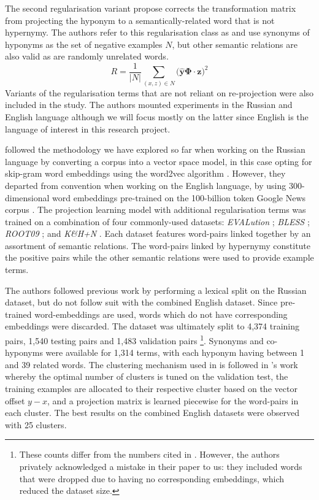 The second regularisation variant \citeauthor{ustalov2017negative} propose corrects the transformation matrix from projecting the hyponym to a semantically-related word that is not hypernymy.  The authors refer to this regularisation class as  and use synonyms of hyponyms as the set of negative examples $N$, but other semantic relations are also valid as are randomly unrelated words.
\[R = \frac{1}{\vert N \vert} \sum_{(x,z) \in N} \big( \hat{\bm{y}} \bm{\Phi} \cdot \bm{z} \big)^2\]
Variants of the regularisation terms that are not reliant on re-projection were also included in the study.  The authors mounted experiments in the Russian and English language although we will focus mostly on the latter since English is the language of interest in this research project.

\citeauthor{ustalov2017negative} followed the methodology we have explored so far when working on the Russian language by converting a corpus into a vector space model, in this case opting for skip-gram word embeddings using the word2vec algorithm \citep{mikolov2013efficient}.  However, they departed from convention when working on the English language, by using 300-dimensional word embeddings pre-trained on the 100-billion token Google News corpus \citep{mikolov2013efficient}.  The projection learning model with additional regularisation terms was trained on a combination of four commonly-used datasets: \textit{EVALution} \citep{santus2015evalution}; \textit{BLESS} \citep{Baroni2011}; \textit{ROOT09} \citep{santus2016nine}; and \textit{K\&H+N} \citep{necsulescu2015reading}.  Each dataset features word-pairs linked together by an assortment of semantic relations.  The word-pairs linked by hypernymy constitute the positive pairs while the other semantic relations were used to provide  example terms.  

The authors followed previous work \citep{levy2015supervised, shwartz2017siege, santus2016nine, roller2014inclusive} by performing a lexical split on the Russian dataset, but do not follow suit with the combined English dataset.  Since pre-trained word-embeddings are used, words which do not have corresponding embeddings were discarded.  The dataset was ultimately split to 4,374 training pairs, 1,540 testing pairs and 1,483 validation pairs \footnote{These counts differ from the numbers cited in \citep{ustalov2017negative}.  However, the authors privately acknowledged a mistake in their paper to us: they included words that were dropped due to having no corresponding embeddings, which reduced the dataset size.}.  Synonyms and co-hyponyms were available for 1,314 terms, with each hyponym having between 1 and 39 related words.  The clustering mechanism used in \citep{Fu2014} is followed in \citeauthor{ustalov2017negative}’s work whereby the optimal number of clusters is tuned on the validation test, the training examples are allocated to their respective cluster based on the vector offset $y - x$, and a projection matrix is learned piecewise for the word-pairs in each cluster.  The best results on the combined English datasets were observed with 25 clusters.

